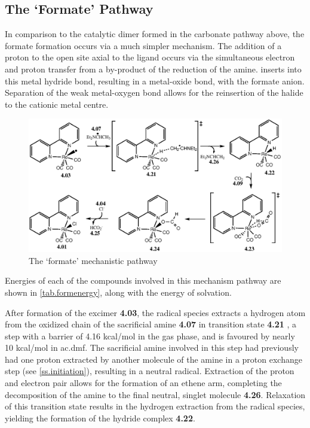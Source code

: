\subsection{The `Formate' Pathway}\label{ss.formate}
In comparison to the catalytic dimer formed in the carbonate pathway above, the formate formation occurs via a much simpler mechanism. The addition of a proton to the open site axial to the ligand occurs via the simultaneous electron and proton transfer from a by-product of the reduction of the amine.  inserts into this metal hydride bond, resulting in a metal-oxide bond, with the formate anion. Separation of the weak metal-oxygen bond allows for the reinsertion of the halide to the cationic metal centre. 

\begin{figure}[!htb]
 \begin{center}
  \includegraphics[clip=true, width=\textwidth, keepaspectratio]{images/formate.eps}
 \end{center}
\caption{The `formate' mechanistic pathway}
\label{fig.formate}
\end{figure} 

Energies of each of the compounds involved in this mechanism pathway are shown in \autoref{tab.formenergy}, along with the energy of solvation.




After formation of the excimer \textbf{4.03}, the radical species extracts a hydrogen atom from the oxidized chain of the sacrificial amine \textbf{4.07} in transition state \textbf{4.21} , a step with a barrier of 4.16 kcal/mol in the gas phase, and is favoured by nearly 10 kcal/mol in \gls{ac.dmf}. The sacrificial amine involved in this step had previously had one proton extracted by another molecule of the amine in a proton exchange step (see \autoref{ss.initiation}), resulting in a neutral radical. Extraction of the proton and electron pair allows for the formation of an ethene arm, completing the decomposition of the amine to the final neutral, singlet molecule \textbf{4.26}. Relaxation of this transition state results in the hydrogen extraction from the radical species, yielding the formation of the hydride complex \textbf{4.22}. 

